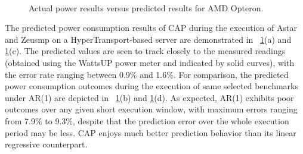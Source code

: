 \begin{figure}[]
  \centering
  \\
  \caption{Actual power results versus predicted results for AMD Opteron.}
  \label{fig:compareamd}
\end{figure}
The predicted power consumption results of CAP during the execution of
Astar and Zeusmp on a HyperTransport-based server are demonstrated in
\figurenames~\ref{fig:compareamd}(a) and \ref{fig:compareamd}(c).  The
predicted values are seen to track closely to the measured readings
(obtained using the WattsUP power meter and indicated by solid curves),
with the error rate ranging between 0.9\% and 1.6\%.  For comparison,
the predicted power consumption outcomes during the execution of same
selected benchmarks under AR(1) are depicted in
\figurenames~\ref{fig:compareamd}(b) and \ref{fig:compareamd}(d).  As
expected, AR(1) exhibits poor outcomes over any given short execution
window, with maximum errors ranging from 7.9\% to 9.3\%, despite that
the prediction error over the whole execution period may be less.  CAP
enjoys much better prediction behavior than its linear regressive
counterpart.

